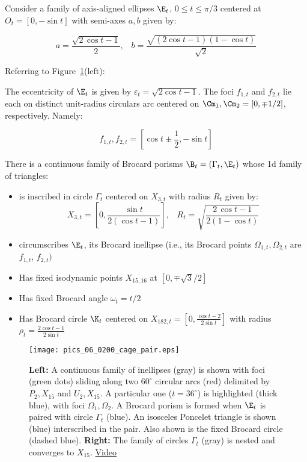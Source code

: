 Consider a family of axis-aligned ellipses $\E_t$, $0{\leq}t{\leq}\pi/3$ centered at $O_t=[0,-\sin{t}]$ with semi-axes $a,b$ given by:

\[a=\frac{\sqrt{2\,\cos{t} -1}}{2},\;\;\;b=\frac{\sqrt{(2\cos t -1)(1-\cos{t}) }}{\sqrt{2}}\]

\noindent Referring to Figure~\ref{fig:cage}(left):

\begin{remark}
The eccentricity of $\E_t$ is given by $\varepsilon_t= \sqrt{2\cos{t}-1}$. The foci $f_{1,t}$ and $f_{2,t}$ lie each on distinct unit-radius circulars arc centered on $\Cm_1,\Cm_2=[0,\mp{1/2}]$, respectively. Namely:

\[ f_{1,t},f_{2,t}=\left[\cos{t}\pm\frac{1}{2},-\sin{t}\right] \]
\label{rem:foci}
\end{remark}


 
\begin{theorem}[Continuous]
There is a continuous family of Brocard porisms $\B_t=(\Gamma_t,\E_t)$ whose 1d family of triangles:

\begin{itemize}
\item is inscribed in circle $\Gamma_t$ centered on $X_{3,t}$ with radius $R_t$ given by:
     \[ X_{3,t}=\left[0,\frac{\sin t}{2(\cos t  -1)}\right],\;\;\;R_t=\sqrt{\frac { 2\,\cos t -1}{2(1-\cos t )}} \]
\item circumscribes $\E_t$, its Brocard inellipse (i.e., its Brocard points $\Omega_{1,t},\Omega_{2,t}$ are $f_{1,t}$, $f_{2,t})$ 
\item Has fixed isodynamic points $X_{15,16}$ at $[0,\mp\sqrt{3}/2]$
\item Has fixed Brocard angle $\omega_t = t/2$%
\item Has Brocard circle $\K_t$ centered on $X_{182,t}=
[0, \frac{\cos t-2}{2\sin t}]$ with radius $\rho_t=
\frac{2\cos t-1}{ 2\sin t}$
\end{itemize}
\label{thm:continuous_iso}
\end{theorem}

\begin{figure}
    \centering
    \texttt{[image: pics\_06\_0200\_cage\_pair.eps]}
    \caption{\textbf{Left:} A continuous family of inellipses (gray) is shown with foci (green dots) sliding along two $60^\circ$ circular arcs (red) delimited by $P_2,X_{15}$ and $U_2,X_{15}$. A particular one ($t=36^\circ$) is highlighted (thick blue), with foci $\Omega_1,\Omega_2$. A Brocard porism is formed when $\E_t$ is paired with circle $\Gamma_t$ (blue). An isosceles Poncelet triangle is shown (blue) interscribed in the pair. Also shown is the fixed Brocard circle (dashed blue). \textbf{Right:} The family of circles $\Gamma_t$ (gray) is nested and converges to $X_{15}$. \href{https://youtu.be/jY_8zxBljuk}{Video}}
    \label{fig:cage}
\end{figure}

